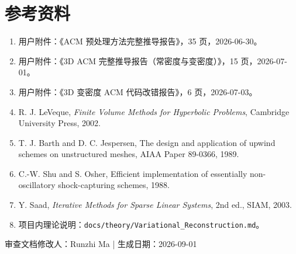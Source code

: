\documentclass[UTF8,11pt,a4paper]{ctexart}
\newcommand{\code}[1]{\nolinkurl{#1}}
\begin{document}
\section{参考资料}

\begin{enumerate}
  \item 用户附件：《ACM 预处理方法完整推导报告》，35 页，2026-06-30。
  \item 用户附件：《3D ACM 完整推导报告（常密度与变密度）》，15 页，2026-07-01。
  \item 用户附件：《3D 变密度 ACM 代码改错报告》，6 页，2026-07-03。
  \item R. J. LeVeque, \emph{Finite Volume Methods for Hyperbolic Problems}, Cambridge University Press, 2002.
  \item T. J. Barth and D. C. Jespersen, The design and application of upwind schemes on unstructured meshes, AIAA Paper 89-0366, 1989.
  \item C.-W. Shu and S. Osher, Efficient implementation of essentially non-oscillatory shock-capturing schemes, 1988.
  \item Y. Saad, \emph{Iterative Methods for Sparse Linear Systems}, 2nd ed., SIAM, 2003.
  \item 项目内理论说明：\code{docs/theory/Variational_Reconstruction.md}。
\end{enumerate}

\vfill
\begin{center}
\small 审查文档修改人：Runzhi Ma \quad | \quad 生成日期：2026-09-01
\end{center}
\end{document}
